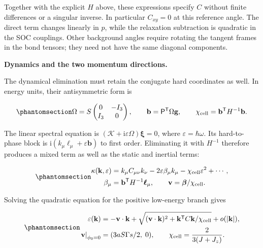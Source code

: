 Together with the explicit \(H\) above, these expressions specify \(C\)
without finite differences or a singular inverse. In particular
\(C_{xy}=0\) at this reference angle. The direct term changes linearly
in \(p\), while the relaxation subtraction is quadratic in the SOC
couplings. Other background angles require rotating the tangent frames
in the bond tensors; they need not have the same diagonal components.

\textbf{Dynamics and the two momentum directions.}

The dynamical elimination must retain the conjugate hard coordinates as
well. In energy units, their antisymmetric form is

\begin{equation}\phantomsection\label{eq-nbcp-y-soc-symplectic-form}{
\Omega=S\begin{pmatrix}0&-I_3\\I_3&0\end{pmatrix},\qquad
\mathbf b=\mathsf P^{\mathsf T}\Omega\mathbf g,\qquad
\chi_{\rm cell}=\mathbf b^{\mathsf T}H^{-1}\mathbf b.
}\end{equation}

The linear spectral equation is
\((\mathcal K+\mathrm i\varepsilon\Omega)\boldsymbol\xi=0\), where
\(\varepsilon=\hbar\omega\). Its hard-to-phase block is
\(\mathrm i(k_\mu\boldsymbol\ell_\mu+\varepsilon\mathbf b)\) to first
order. Eliminating it with \(H^{-1}\) therefore produces a mixed term as
well as the static and inertial terms:

\begin{equation}\phantomsection\label{eq-nbcp-y-soc-dynamic-schur}{
\begin{aligned}
\kappa(\mathbf k,\varepsilon)
&=k_\mu C_{\mu\nu}k_\nu
-2\varepsilon\beta_\mu k_\mu-\chi_{\rm cell}\varepsilon^2+\cdots,\\
\beta_\mu&=\mathbf b^{\mathsf T}H^{-1}\boldsymbol\ell_\mu,
\qquad \mathbf v=\boldsymbol\beta/\chi_{\rm cell}.
\end{aligned}
}\end{equation}

Solving the quadratic equation for the positive low-energy branch gives

\begin{equation}\phantomsection\label{eq-nbcp-y-soc-nonreciprocal-dispersion}{
\begin{aligned}
\varepsilon(\mathbf k)
&=-\mathbf v\cdot\mathbf k+
\sqrt{(\mathbf v\cdot\mathbf k)^2+
\mathbf k^{\mathsf T}C\mathbf k/\chi_{\rm cell}}+o(|\mathbf k|),\\
\left.\mathbf v\right|_{\phi_0=0}
&=(3aS\Gamma s/2,\;0),\qquad
\chi_{\rm cell}=\frac{2}{3(J+J_z)}.
\end{aligned}
}\end{equation}

